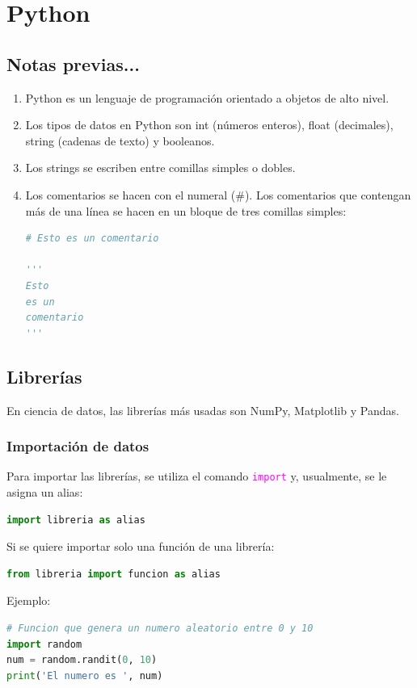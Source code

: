 \documentclass[a4paper, 12pt]{book}
\begin{document}
\chapter{Python}
\lstset{style=estilopython}
\section{Notas previas...}
\begin{enumerate}
\item Python es un lenguaje de programación orientado a objetos de alto nivel.
\item Los tipos de datos en Python son int (números enteros), float (decimales), string (cadenas de texto) y booleanos.
\item Los strings se escriben entre comillas simples o dobles.
\item Los comentarios se hacen con el numeral ($\#$). Los comentarios que contengan más de una línea se hacen en un bloque de tres comillas simples:
\begin{lstlisting}[language=Python]
# Esto es un comentario
	
'''
Esto
es un
comentario
'''
\end{lstlisting}
\end{enumerate}

\section{Librerías}
En ciencia de datos, las librerías más usadas son NumPy, Matplotlib y Pandas.
\subsection{Importación de datos}
Para importar las librerías, se utiliza el comando \texttt{\textcolor{magenta}{import}} y, usualmente, se le asigna un alias:
\begin{lstlisting}[language=Python]
import libreria as alias
\end{lstlisting}
Si se quiere importar solo una función de una librería:
\begin{lstlisting}[language=Python]
from libreria import funcion as alias
\end{lstlisting}
Ejemplo:
\begin{lstlisting}[language=Python]
# Funcion que genera un numero aleatorio entre 0 y 10
import random
num = random.randit(0, 10)
print('El numero es ', num)
\end{lstlisting}
\end{document}
